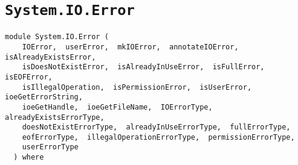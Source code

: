 \chapter{\texttt{System.IO.Error}}
\label{module:System.IO.Error}
\haddockbeginheader
{\haddockverb\begin{verbatim}
module System.IO.Error (
    IOError,  userError,  mkIOError,  annotateIOError,  isAlreadyExistsError, 
    isDoesNotExistError,  isAlreadyInUseError,  isFullError,  isEOFError, 
    isIllegalOperation,  isPermissionError,  isUserError,  ioeGetErrorString, 
    ioeGetHandle,  ioeGetFileName,  IOErrorType,  alreadyExistsErrorType, 
    doesNotExistErrorType,  alreadyInUseErrorType,  fullErrorType, 
    eofErrorType,  illegalOperationErrorType,  permissionErrorType, 
    userErrorType
  ) where\end{verbatim}}
\haddockendheader

